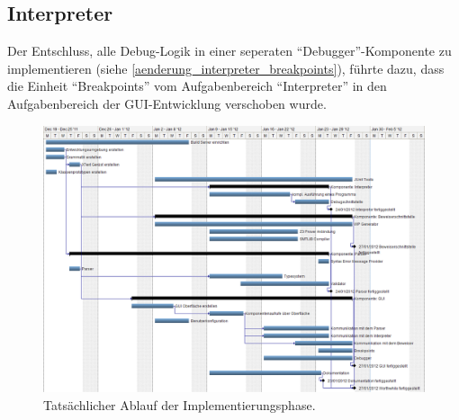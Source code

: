 \subsection{Interpreter}
Der Entschluss, alle Debug-Logik in einer seperaten "`Debugger"'-Komponente zu implementieren (siehe \ref{aenderung_interpreter_breakpoints}), führte dazu, dass die Einheit "`Breakpoints"' vom Aufgabenbereich "`Interpreter"' in den Aufgabenbereich der GUI-Entwicklung verschoben wurde.

\begin{landscape}%
	\begin{figure}%
		\vspace{-2cm}
		\includegraphics[height=1.2\textheight]{images/gantt_implementierung_diag.png}%
		\caption{Tatsächlicher Ablauf der Implementierungsphase.}%
	\end{figure}%
\end{landscape}
